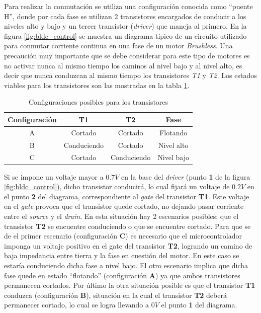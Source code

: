 \documentclass[main]{subfiles}
\begin{document}
Para realizar la conmutación se utiliza una configuración conocida como ``puente H'', donde por cada fase se utilizan 2 transistores encargados de conducir a los niveles alto y bajo y un tercer transistor (\emph{driver}) que maneja al primero. En la figura \ref{fig:bldc_control} se muestra un diagrama típico de un circuito utilizado para conmutar corriente continua en una fase de un motor \emph{Brushless}. Una precaución muy importante que se debe considerar para este tipo de motores es no activar nunca al mismo tiempo los caminos al nivel bajo y al nivel alto, es decir que nunca conduzcan al mismo tiempo los transistores \emph{T1} y \emph{T2}. Los estados viables para los transistores son las mostradas en la tabla \ref{tab:estado_transistores}.\\

\begin{table}[H]
\begin{center}
\vspace{-10pt}
\begin{tabular}{|c|c|c|c|}
\hline
\textbf{Configuración} & \textbf{T1} & \textbf{T2} & \textbf{Fase} \\ \hline
A & Cortado & Cortado & Flotando \\
B & Conduciendo & Cortado & Nivel alto \\
C & Cortado & Conduciendo & Nivel bajo \\
\hline
\end{tabular}
\caption{Configuraciones posibles para los transistores}
\vspace{-20pt}
\label{tab:estado_transistores}
\end{center}
\end{table}

Si se impone un voltaje mayor a $0.7 V$ en la base del \emph{driver} (punto \textbf{1} de la figura \ref{fig:bldc_control}), dicho transistor conducirá, lo cual fijará un voltaje de $0.2V$ en el punto \textbf{2} del diagrama, correspondiente al \emph{gate} del transistor \textbf{T1}. Este voltaje en el \emph{gate} provoca que el transistor quede cortado, no dejando pasar corriente entre el \emph{source} y el \emph{drain}. En esta situación hay 2 escenarios posibles: que el transistor \textbf{T2} se encuentre conduciendo o que se encuentre cortado. Para que se de el primer escenario (configuración \textbf{C}) es necesario que el microcontrolador imponga un voltaje positivo en el gate del transistor \textbf{T2}, logrando un camino de baja impedancia entre tierra y la fase en cuestión del motor. En este caso se estaría conduciendo dicha fase a nivel bajo. El otro escenario implica que dicha fase quede en estado ``flotando'' (configuración \textbf{A}) ya que ambos transistores permanecen cortados. Por último la otra situación posible es que el transistor \textbf{T1} conduzca (configuración \textbf{B}), situación en la cual el transistor \textbf{T2} deberá permanecer cortado, lo cual se logra llevando a $0V$ el punto \textbf{1} del diagrama.\\
\end{document}
